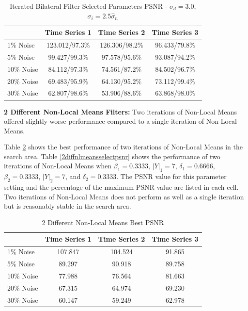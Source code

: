 \documentclass[11pt]{article}
\newcommand{\vs}{\vspace{0.1in}}
\theoremstyle{definition}
\begin{document}
\begin{table}[!h]
\small
\begin{center}
\begin{tabular}{l | c | c | c}
 & Time Series 1 & Time Series 2 & Time Series 3 \\ \hline
1\% Noise & 123.012/97.3\% & 126.306/98.2\% & 96.433/79.8\% \\ \hline
5\% Noise & 99.427/99.3\% & 97.578/95.6\% & 93.087/94.2\% \\ \hline
10\% Noise & 84.112/97.3\% & 74.561/87.2\% & 84.502/96.7\% \\ \hline
20\% Noise & 69.483/95.9\% & 64.130/95.2\% & 73.112/99.4\% \\ \hline
30\% Noise & 62.807/98.6\% & 53.906/88.6\% & 63.868/98.0\%
\end{tabular}
\caption{Iterated Bilateral Filter Selected Parameters PSNR - $\sigma_d = 3.0$, $\sigma_i = 2.5 \hat{\sigma}_n$}
\label{itrbilateralselectpsnr}
\end{center}
\end{table}

\vs
\textbf{2 Different Non-Local Means Filters:} Two iterations of Non-Local Means offered slightly worse performance compared to a single iteration of Non-Local Means.

Table \ref{2diffnlmeansbestpsnr} shows the best performance of two iterations of Non-Local Means in the search area. Table \ref{2diffnlmeansselectpsnr} shows the performance of two iterations of Non-Local Means when $\beta_1 = 0.3333$, $\lvert Y \rvert _1 = 7$, $\delta _1 = 0.6666$, $\beta_2 = 0.3333$, $\lvert Y \rvert _2 = 7$, and $\delta _2 = 0.3333$. The PSNR value for this parameter setting and the percentage of the maximum PSNR value are listed in each cell. Two iterations of Non-Local Means does not perform as well as a single iteration but is reasonably stable in the search area.

\begin{table}[!h]
\small
\begin{center}
\begin{tabular}{l | c | c | c}
 & Time Series 1 & Time Series 2 & Time Series 3 \\ \hline
1\% Noise & 107.847 & 104.524 & 91.865 \\ \hline
5\% Noise & 89.297 & 90.918 & 89.758 \\ \hline
10\% Noise & 77.988 & 76.564 & 81.663 \\ \hline
20\% Noise & 67.315 & 64.974 & 69.230 \\ \hline
30\% Noise & 60.147 & 59.249 & 62.978
\end{tabular}
\caption{2 Different Non-Local Means Best PSNR}
\label{2diffnlmeansbestpsnr}
\end{center}
\end{table}
\end{document}
